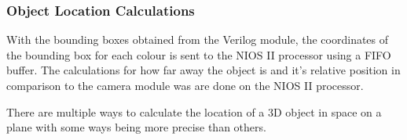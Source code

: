 \documentclass[a4paper]{article}
\begin{document}
\subsubsection{Object Location Calculations}

With the bounding boxes obtained from the Verilog module, the coordinates of the
bounding box for each colour is sent to the NIOS II processor using a FIFO buffer.
The calculations for how far away the object is and it's relative position in 
comparison to the camera module was are done on the NIOS II processor. 

There are multiple ways to calculate the location of a 3D object in space on a plane
with some ways being more precise than others. 

\end{document}
